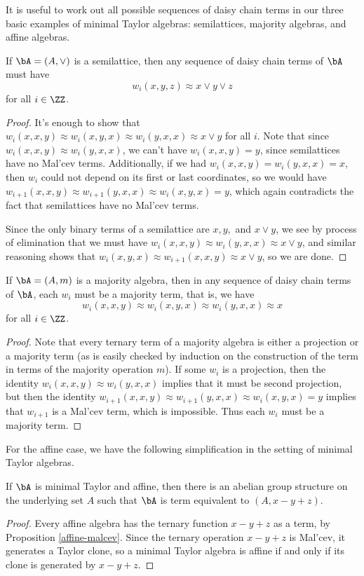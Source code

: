 It is useful to work out all possible sequences of daisy chain terms in our three basic examples of minimal Taylor algebras: semilattices, majority algebras, and affine algebras.

\begin{prop} If $\bA = (A,\vee)$ is a semilattice, then any sequence of daisy chain terms of $\bA$ must have
\[
w_i(x,y,z) \approx x \vee y \vee z
\]
for all $i \in \ZZ$.
\end{prop}
\begin{proof} It's enough to show that $w_i(x,x,y) \approx w_i(x,y,x) \approx w_i(y,x,x) \approx x \vee y$ for all $i$. Note that since $w_i(x,x,y) \approx w_i(y,x,x)$, we can't have $w_i(x,x,y) = y$, since semilattices have no Mal'cev terms. Additionally, if we had $w_i(x,x,y) = w_i(y,x,x) = x$, then $w_i$ could not depend on its first or last coordinates, so we would have $w_{i+1}(x,x,y) \approx w_{i+1}(y,x,x) \approx w_i(x,y,x) = y$, which again contradicts the fact that semilattices have no Mal'cev terms.

Since the only binary terms of a semilattice are $x, y,$ and $x \vee y$, we see by process of elimination that we must have $w_i(x,x,y) \approx w_i(y,x,x) \approx x \vee y$, and similar reasoning shows that $w_i(x,y,x) \approx w_{i+1}(x,x,y) \approx x \vee y$, so we are done.
\end{proof}

\begin{prop} If $\bA = (A,m)$ is a majority algebra, then in any sequence of daisy chain terms of $\bA$, each $w_i$ must be a majority term, that is, we have
\[
w_i(x,x,y) \approx w_i(x,y,x) \approx w_i(y,x,x) \approx x
\]
for all $i \in \ZZ$.
\end{prop}
\begin{proof} Note that every ternary term of a majority algebra is either a projection or a majority term (as is easily checked by induction on the construction of the term in terms of the majority operation $m$). If some $w_i$ is a projection, then the identity $w_i(x,x,y) \approx w_i(y,x,x)$ implies that it must be second projection, but then the identity $w_{i+1}(x,x,y) \approx w_{i+1}(y,x,x) \approx w_i(x,y,x) = y$ implies that $w_{i+1}$ is a Mal'cev term, which is impossible. Thus each $w_i$ must be a majority term.
\end{proof}

For the affine case, we have the following simplification in the setting of minimal Taylor algebras.

\begin{prop} If $\bA$ is minimal Taylor and affine, then there is an abelian group structure on the underlying set $A$ such that $\bA$ is term equivalent to $(A,x-y+z)$.
\end{prop}
\begin{proof} Every affine algebra has the ternary function $x - y + z$ as a term, by Proposition \ref{affine-malcev}. Since the ternary operation $x-y+z$ is Mal'cev, it generates a Taylor clone, so a minimal Taylor algebra is affine if and only if its clone is generated by $x-y+z$.
\end{proof}

